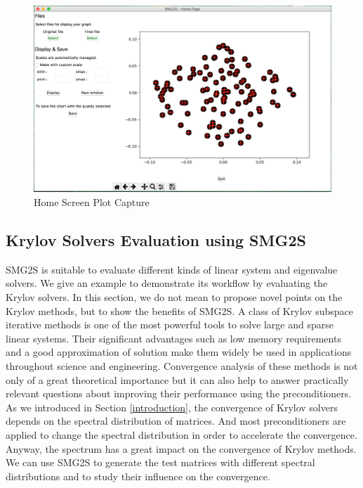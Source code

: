 \begin{figure}[htbp]
	\label{fig:Home Screen Plot Capture}
	\caption{Home Screen Plot Capture}
	\centering
	\includegraphics[width=6.2in]{fig/home_screen.png}
\end{figure}


\subsection{Krylov Solvers Evaluation using SMG2S}\label{application}

SMG2S is suitable to evaluate different kinds of linear system and eigenvalue solvers. We give an example to demonstrate its workflow by evaluating the Krylov solvers. In this section, we do not mean to propose novel points on the Krylov methods, but to show the benefits of SMG2S. A class of Krylov subspace iterative methods is one of the most powerful tools to solve large and sparse linear systems. Their significant advantages such as low memory requirements and a good approximation of solution make them widely be used in applications throughout science and engineering. Convergence analysis of these methods is not only of a great theoretical importance but it can also help to answer practically relevant questions about improving their performance using the preconditioners. As we introduced in Section \ref{introduction}, the convergence of Krylov solvers depends on the spectral distribution of matrices. And most preconditioners are applied to change the spectral distribution in order to accelerate the convergence. Anyway, the spectrum has a great impact on the convergence of Krylov methods. We can use SMG2S to generate the test matrices with different spectral distributions and to study their influence on the convergence.

